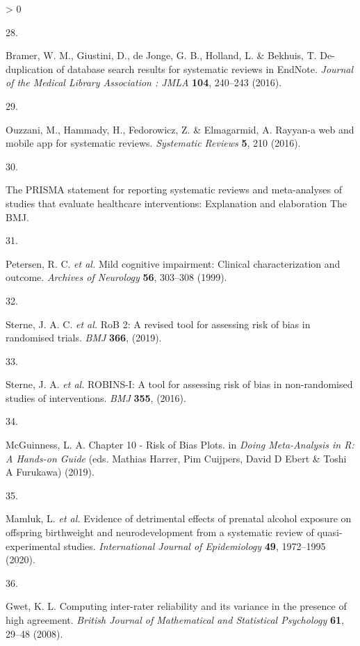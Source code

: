 \documentclass[a4paper, twoside]{templates/ociamthesis}
\newlength{\cslhangindent}
\newlength{\csllabelwidth}
\newenvironment{CSLReferences}[3] %
 {%
  \setlength{\parindent}{0pt}
  \ifodd #1 \everypar{\setlength{\hangindent}{\cslhangindent}}\ignorespaces\fi
  \ifnum #2 > 0
  \setlength{\parskip}{#2\baselineskip}
  \fi
 }%
 {}
\newcommand{\CSLLeftMargin}[1]{\parbox[t]{\maxof{\widthof{#1}}{\csllabelwidth}}{#1}}
\newcommand{\CSLRightInline}[1]{\parbox[t]{\linewidth - \csllabelwidth}{#1}}
\begin{document}
\begin{CSLReferences}{0}{0}
\leavevmode\hypertarget{ref-bramer2016}{}%
\CSLLeftMargin{28. }
\CSLRightInline{Bramer, W. M., Giustini, D., de Jonge, G. B., Holland, L. \& Bekhuis, T. De-duplication of database search results for systematic reviews in {EndNote}. \emph{Journal of the Medical Library Association : JMLA} \textbf{104}, 240--243 (2016).}

\leavevmode\hypertarget{ref-ouzzani2016}{}%
\CSLLeftMargin{29. }
\CSLRightInline{Ouzzani, M., Hammady, H., Fedorowicz, Z. \& Elmagarmid, A. Rayyan-a web and mobile app for systematic reviews. \emph{Systematic Reviews} \textbf{5}, 210 (2016).}

\leavevmode\hypertarget{ref-zotero-766}{}%
\CSLLeftMargin{30. }
\CSLRightInline{The {PRISMA} statement for reporting systematic reviews and meta-analyses of studies that evaluate healthcare interventions: Explanation and elaboration \textbar{} {The BMJ}.}

\leavevmode\hypertarget{ref-petersen1999}{}%
\CSLLeftMargin{31. }
\CSLRightInline{Petersen, R. C. \emph{et al.} Mild cognitive impairment: Clinical characterization and outcome. \emph{Archives of Neurology} \textbf{56}, 303--308 (1999).}

\leavevmode\hypertarget{ref-sterne2019}{}%
\CSLLeftMargin{32. }
\CSLRightInline{Sterne, J. A. C. \emph{et al.} {RoB} 2: A revised tool for assessing risk of bias in randomised trials. \emph{BMJ} \textbf{366}, (2019).}

\leavevmode\hypertarget{ref-sterne2016}{}%
\CSLLeftMargin{33. }
\CSLRightInline{Sterne, J. A. \emph{et al.} {ROBINS}-{I}: A tool for assessing risk of bias in non-randomised studies of interventions. \emph{BMJ} \textbf{355}, (2016).}

\leavevmode\hypertarget{ref-mcguinness2019}{}%
\CSLLeftMargin{34. }
\CSLRightInline{McGuinness, L. A. Chapter 10 - {Risk} of {Bias Plots}. in \emph{Doing {Meta}-{Analysis} in {R}: {A Hands}-on {Guide}} (eds. Mathias Harrer, Pim Cuijpers, David D Ebert \& Toshi A Furukawa) (2019).}

\leavevmode\hypertarget{ref-mamluk2020}{}%
\CSLLeftMargin{35. }
\CSLRightInline{Mamluk, L. \emph{et al.} Evidence of detrimental effects of prenatal alcohol exposure on offspring birthweight and neurodevelopment from a systematic review of quasi-experimental studies. \emph{International Journal of Epidemiology} \textbf{49}, 1972--1995 (2020).}

\leavevmode\hypertarget{ref-gwet2008}{}%
\CSLLeftMargin{36. }
\CSLRightInline{Gwet, K. L. Computing inter-rater reliability and its variance in the presence of high agreement. \emph{British Journal of Mathematical and Statistical Psychology} \textbf{61}, 29--48 (2008).}


\end{CSLReferences}
\end{document}
